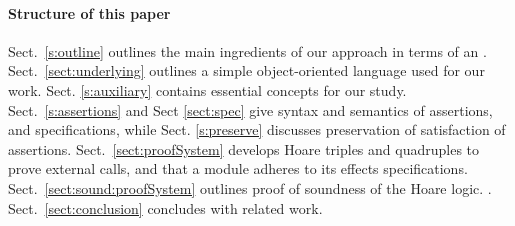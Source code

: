  \paragraph{Structure of this paper}
Sect.\ \ref{s:outline}   outlines the main ingredients of our approach in terms of an .
Sect.\ \ref{sect:underlying} outlines a simple object-oriented language used for our work. 
 Sect. \ref{s:auxiliary}  {contains essential concepts for our study}.
Sect.\ \ref{s:assertions} and 
 Sect \ref{sect:spec}  give syntax and semantics of assertions, and  specifications,
{while Sect. \ref{s:preserve} discusses preservation of satisfaction of assertions.}
Sect.\ \ref{sect:proofSystem} develops Hoare triples and quadruples to prove external calls, and that a module adheres to its \tamed effects specifications.
Sect.\ \ref{sect:sound:proofSystem} outlines  proof of soundness of
the Hoare logic. 
. 
 Sect.\ \ref{sect:conclusion} concludes with related work. 
 
 

